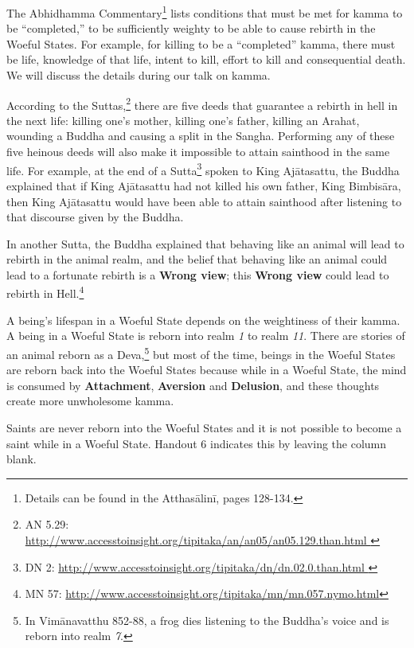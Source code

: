 The Abhidhamma Commentary\footnote{Details can be found in the Atthasālinī, pages 128-134.} lists conditions that must be met for kamma to be “completed,” to be sufficiently weighty to be able to cause rebirth in the Woeful States. For example, for killing to be a “completed” kamma, there must be life, knowledge of that life, intent to kill, effort to kill and consequential death. We will discuss the details during our talk on kamma.

According to the Suttas,\footnote{AN 5.29: \url{http://www.accesstoinsight.org/tipitaka/an/an05/an05.129.than.html }} there are five deeds that guarantee a rebirth in hell in the next life: killing one’s mother, killing one’s father, killing an Arahat, wounding a Buddha and causing a split in the Sangha. Performing any of these five heinous deeds will also make it impossible to attain sainthood in the same life. For example, at the end of a Sutta\footnote{DN 2: \url{http://www.accesstoinsight.org/tipitaka/dn/dn.02.0.than.html }} spoken to King Ajātasattu, the Buddha explained that if King Ajātasattu had not killed his own father, King Bimbisāra, then King Ajātasattu would have been able to attain sainthood after listening to that discourse given by the Buddha.

In another Sutta, the Buddha explained that behaving like an animal will lead to rebirth in the animal realm, and the belief that behaving like an animal could lead to a fortunate rebirth is a \textbf{Wrong view}; this \textbf{Wrong view} could lead to rebirth in Hell.\footnote{MN 57: \url{http://www.accesstoinsight.org/tipitaka/mn/mn.057.nymo.html}}

A being’s lifespan in a Woeful State depends on the weightiness of their kamma. A being in a Woeful State is reborn into realm \textit{1} to realm \textit{11}. There are stories of an animal reborn as a Deva,\footnote{In Vimānavatthu 852-88, a frog dies listening to the Buddha’s voice and is reborn into realm \textit{7}.} but most of the time, beings in the Woeful States are reborn back into the Woeful States because while in a Woeful State, the mind is consumed by \textbf{Attachment}, \textbf{Aversion} and \textbf{Delusion}, and these thoughts create more unwholesome kamma.

Saints are never reborn into the Woeful States and it is not possible to become a saint while in a Woeful State. Handout 6 indicates this by leaving the column blank.

\pagebreak

